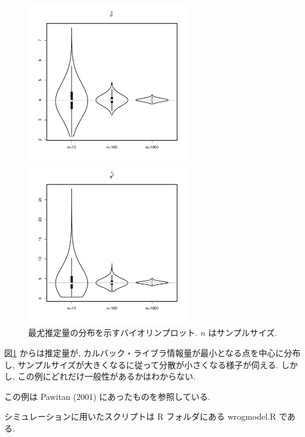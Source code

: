\documentclass[a4paper, 12pt]{jarticle}
\begin{document}
\begin{figure}[htbp]
 \begin{minipage}{0.5\hsize}
  \begin{center}
   \includegraphics[width=70mm]{img/wrongmodel_mu.pdf}
  \end{center}
 \end{minipage}
 \begin{minipage}{0.5\hsize}
  \begin{center}
   \includegraphics[width=70mm]{img/wrongmodel_sigma2.pdf}
  \end{center}
 \end{minipage}
   \caption{最尤推定量の分布を示すバイオリンプロット. $n$ はサンプルサイズ.}
  \label{figWrongmodel}
\end{figure}

図\ref{figWrongmodel} からは推定量が, カルバック・ライブラ情報量が最小となる点を中心に分布し, サンプルサイズが大きくなるに従って分散が小さくなる様子が伺える.
しかし, この例にどれだけ一般性があるかはわからない.

この例は Pawitan (2001) にあったものを参照している.

シミュレーションに用いたスクリプトは R フォルダにある wrogmodel.R である.
\end{document}

